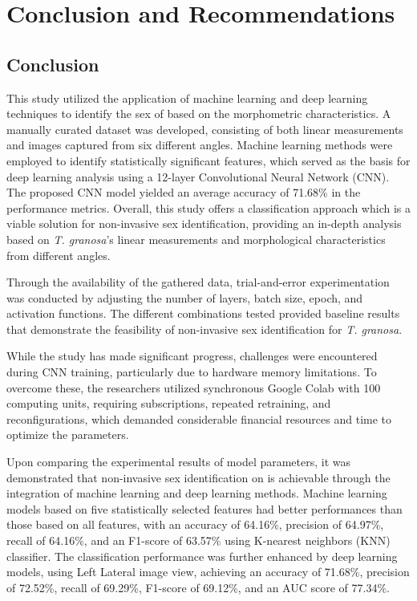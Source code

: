 \chapter{Conclusion and Recommendations}


\section{Conclusion}

This study utilized the application of machine learning and deep learning techniques to identify the sex of \Tgranosa based on the morphometric characteristics. A manually curated dataset was developed, consisting of both linear measurements and images captured from six different angles. Machine learning methods were employed to identify statistically significant features, which served as the basis for deep learning analysis using a 12-layer Convolutional Neural Network (CNN). The proposed CNN model yielded an average accuracy of 71.68\% in the performance metrics. Overall, this study offers a classification approach which is a viable solution for non-invasive sex identification, providing an in-depth analysis based on \textit{T. granosa}’s linear measurements and morphological characteristics from different angles.

Through the availability of the gathered data, trial-and-error experimentation was conducted by adjusting the number of layers, batch size, epoch, and activation functions. The different combinations tested provided baseline results that demonstrate the feasibility of non-invasive sex identification for \textit{T. granosa}. 

While the study has made significant progress, challenges were encountered during CNN training, particularly due to hardware memory limitations. To overcome these, the researchers utilized synchronous Google Colab with 100 computing units, requiring subscriptions, repeated retraining, and reconfigurations, which demanded considerable financial resources and time to optimize the parameters. 

Upon comparing the experimental results of model parameters, it was demonstrated that non-invasive sex identification on \Tgranosa is achievable through the integration of machine learning and deep learning methods. Machine learning models based on five statistically selected features had better performances than those based on all features, with an accuracy of 64.16\%, precision of 64.97\%, recall of 64.16\%, and an F1-score of 63.57\% using K-nearest neighbors (KNN) classifier. The classification performance was further enhanced by deep learning models, using Left Lateral image view, achieving an accuracy of 71.68\%, precision of 72.52\%, recall of 69.29\%, F1-score of 69.12\%, and an AUC score of 77.34\%. 

